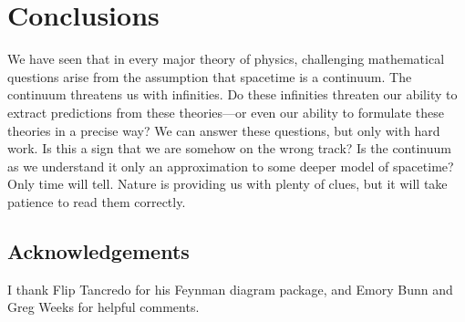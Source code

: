 \documentclass[12pt]{article}
\begin{document}
\section{Conclusions}

We have seen that in every major theory of physics, challenging mathematical 
questions arise from the assumption that spacetime is a continuum.  The continuum threatens us with infinities.  Do these infinities threaten our ability to extract predictions from these theories---or even our ability to formulate these theories in a precise way?   We can answer these questions, but only with hard work.   Is this a sign that we are somehow on the wrong track?  Is the continuum as we understand it only an approximation to some deeper model of spacetime?   Only time will tell.   Nature is providing us with plenty of clues, but it will take patience to read them correctly.

\subsection*{Acknowledgements}

I thank Flip Tancredo for his Feynman diagram package, and Emory Bunn and Greg Weeks for helpful comments.
\end{document}
